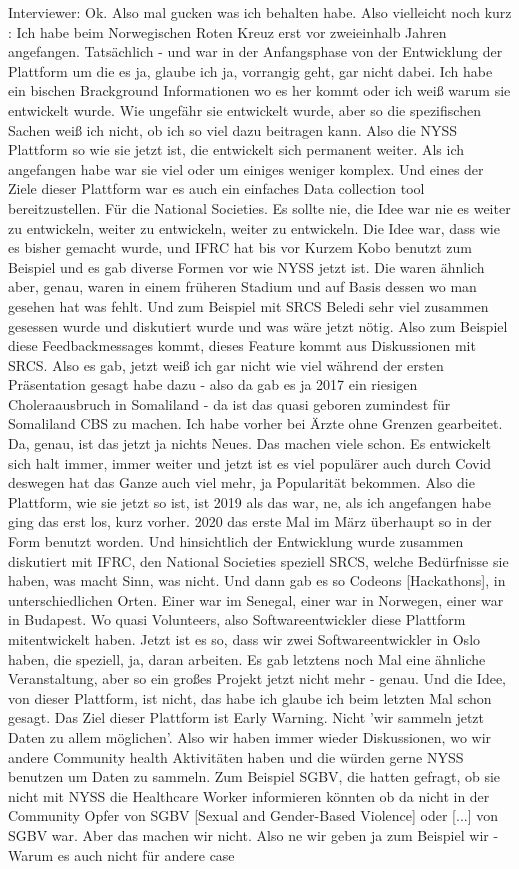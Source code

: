 Interviewer: Ok. Also mal gucken was ich behalten habe. Also vielleicht noch kurz : Ich habe beim Norwegischen Roten Kreuz erst vor zweieinhalb Jahren angefangen. Tatsächlich - und war in der Anfangsphase von der Entwicklung der Plattform um die es ja, glaube ich ja, vorrangig geht, gar nicht dabei. Ich habe ein bischen Brackground Informationen wo es her kommt oder ich weiß warum sie entwickelt wurde. Wie ungefähr sie entwickelt wurde, aber so die spezifischen Sachen weiß ich nicht, ob ich so viel dazu beitragen kann. Also die NYSS Plattform so wie sie jetzt ist, die entwickelt sich permanent weiter. Als ich angefangen habe war sie viel oder um einiges weniger komplex. Und eines der Ziele dieser Plattform war es auch ein einfaches Data collection tool bereitzustellen. Für die National Societies. Es sollte nie, die Idee war nie es weiter zu entwickeln, weiter zu entwickeln, weiter zu entwickeln. Die Idee war, dass wie es bisher gemacht wurde, und IFRC hat bis vor Kurzem Kobo benutzt zum Beispiel und es gab diverse Formen vor wie NYSS jetzt ist. Die waren ähnlich aber, genau, waren in einem früheren Stadium und auf Basis dessen wo man gesehen hat was fehlt. Und zum Beispiel mit SRCS Beledi sehr viel zusammen gesessen wurde und diskutiert wurde und was wäre jetzt nötig. Also zum Beispiel diese Feedbackmessages kommt, dieses Feature kommt aus Diskussionen mit SRCS. Also es gab, jetzt weiß ich gar nicht wie viel während der ersten Präsentation gesagt habe dazu - also da gab es ja 2017 ein riesigen Choleraausbruch in Somaliland - da ist das quasi geboren zumindest für Somaliland CBS zu machen. Ich habe vorher bei Ärzte ohne Grenzen gearbeitet. Da, genau, ist das jetzt ja nichts Neues. Das machen viele schon. Es entwickelt sich halt immer, immer weiter und jetzt ist es viel populärer auch durch Covid deswegen hat das Ganze auch viel mehr, ja Popularität bekommen. Also die Plattform, wie sie jetzt so ist, ist 2019 als das war, ne, als ich angefangen habe ging das erst los, kurz vorher. 2020 das erste Mal im März überhaupt so in der Form benutzt worden. Und hinsichtlich der Entwicklung wurde zusammen diskutiert mit IFRC, den National Societies speziell SRCS, welche Bedürfnisse sie haben, was macht Sinn, was nicht. Und dann gab es so Codeons [Hackathons], in unterschiedlichen Orten. Einer war im Senegal, einer war in Norwegen, einer war in Budapest. Wo quasi Volunteers, also Softwareentwickler diese Plattform mitentwickelt haben. Jetzt ist es so, dass wir zwei Softwareentwickler in Oslo haben, die speziell, ja, daran arbeiten. Es gab letztens noch Mal eine ähnliche Veranstaltung, aber so ein großes Projekt jetzt nicht mehr - genau. Und die Idee, von dieser Plattform, ist nicht, das habe ich glaube ich beim letzten Mal schon gesagt. Das Ziel dieser Plattform ist Early Warning. Nicht 'wir sammeln jetzt Daten zu allem möglichen'. Also wir haben immer wieder Diskussionen, wo wir andere Community health Aktivitäten haben und die würden gerne NYSS benutzen um Daten zu sammeln. Zum Beispiel SGBV, die hatten gefragt, ob sie nicht mit NYSS die Healthcare Worker informieren könnten ob da nicht in der Community Opfer von SGBV [Sexual and Gender-Based Violence] oder [...] von SGBV war. Aber das machen wir nicht. Also ne wir geben ja zum Beispiel wir - Warum es auch nicht für andere case 